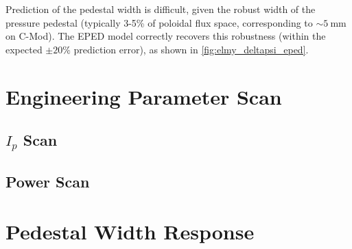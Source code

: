 Prediction of the pedestal width is difficult, given the robust width of the pressure pedestal (typically 3-5\% of poloidal flux space, corresponding to $\sim \SI{5}{\milli\meter}$ on C-Mod).  The EPED model correctly recovers this robustness (within the expected $\pm 20\%$ prediction error), as shown in \cref{fig:elmy_deltapsi_eped}.

\begin{figure}
 \pushtooutside
\end{figure}


\nicesectionending

\section{Engineering Parameter Scan}\label{sec:elmy_engineer}

\subsection{$I_p$ Scan}\label{subsec:elmy_ip}

\subsection{Power Scan}\label{subsec:elmy_power}

\nicesectionending

\section{Pedestal Width Response}\label{sec:elmy_width}

\nicechapterending


